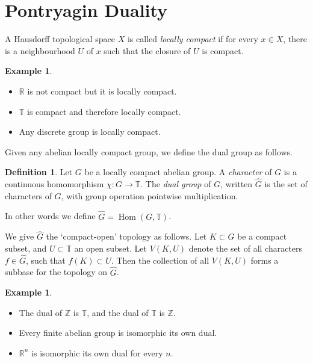 \documentclass[12pt, a4paper]{article}
\theoremstyle{definition}
\newtheorem{example}[theorem]{Example}
\newtheorem{definition}[theorem]{Definition}
\DeclareMathOperator{\Hom}{Hom}
\begin{document}
\section{Pontryagin Duality}

A Hausdorff topological space $X$ is called \emph{locally compact} if for every $x \in X$, there is a neighbourhood $U$ of $x$ such that the closure of $U$ is compact.

\begin{example}
~
\begin{itemize}
\itemsep0em
\item $\mathbb{R}$ is not compact but it is locally compact.
\item $\mathbb{T}$ is compact and therefore locally compact.
\item Any discrete group is locally compact.
\end{itemize}
\end{example}

Given any abelian locally compact group, we define the dual group as follows.

\begin{definition}
Let $G$ be a locally compact abelian group. A \emph{character} of $G$ is a continuous homomorphism $\chi : G \to \mathbb{T}$. The \emph{dual group} of $G$, written $\widehat{G}$ is the set of characters of $G$, with group operation pointwise multiplication.

In other words we define $\widehat{G} = \Hom(G, \mathbb{T})$.
\end{definition}

We give $\widehat{G}$ the `compact-open' topology as follows. Let $K \subset G$ be a compact subset, and $U \subset \mathbb{T}$ an open subset. Let $V(K, U)$ denote the set of all characters $f \in \widehat{G}$, such that $f(K) \subset U$. Then the collection of all $V(K, U)$ forms a subbase for the topology on $\widehat{G}$.

\begin{example}
~
\begin{itemize}
\itemsep0em
\item The dual of $\mathbb{Z}$ is $\mathbb{T}$, and the dual of $\mathbb{T}$ is $\mathbb{Z}$.
\item Every finite abelian group is isomorphic its own dual.
\item $\mathbb{R}^n$ is isomorphic its own dual for every $n$.
\end{itemize}
\end{example}
\end{document}
